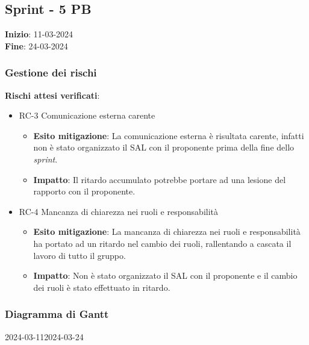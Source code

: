 \subsection{Sprint - 5 PB}
\textbf{Inizio}: 11-03-2024 \\
\textbf{Fine}: 24-03-2024

\subsubsection{Gestione dei rischi}
\textbf{Rischi attesi verificati}:

\begin{itemize}
	\item RC-3 Comunicazione esterna carente
	      \begin{itemize}
		      \item \textbf{Esito mitigazione}: La comunicazione esterna è
		            risultata carente, infatti non è stato organizzato il SAL
		            con il proponente prima della fine dello \textit{sprint}.

		      \item \textbf{Impatto}: Il ritardo accumulato potrebbe portare
		            ad una lesione del rapporto con il proponente.
	      \end{itemize}

	\item RC-4 Mancanza di chiarezza nei ruoli e responsabilità
	      \begin{itemize}
		      \item \textbf{Esito mitigazione}: La mancanza di chiarezza nei
		            ruoli e responsabilità ha portato ad un ritardo nel cambio
		            dei ruoli, rallentando a cascata il lavoro di tutto il
		            gruppo.

		      \item \textbf{Impatto}: Non è stato organizzato il SAL con il
		            proponente e il cambio dei ruoli è stato effettuato in
		            ritardo.
	      \end{itemize}
\end{itemize}

\subsubsection{Diagramma di Gantt}

\begin{ganttchart}[
		x unit=0.6cm, %
		y unit chart=0.6cm,
		bar/.style={fill=blue!50},
		bar height=0.5,
		time slot format=isodate,
		time slot unit=day,
		vgrid,
		today=2024-03-12,
		today rule/.style={draw=red, ultra thick}
	]{2024-03-11}{2024-03-24}
	 \\
	 \\
	 \\
	 \\
	 \\
\end{ganttchart}

